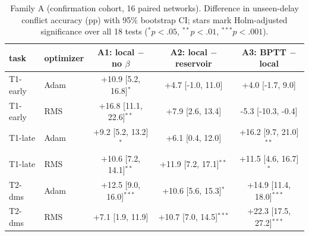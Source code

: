 \begin{table}[t]\centering\small
\caption{Family A (confirmation cohort, 16 paired networks). Difference in unseen-delay conflict accuracy (pp) with 95\% bootstrap CI; stars mark Holm-adjusted significance over all 18 tests ($^*p<.05$, $^{**}p<.01$, $^{***}p<.001$).}\label{tab:familyA}
\begin{tabular}{llccc}\toprule
task & optimizer & A1: local $-$ no $\beta$ & A2: local $-$ reservoir & A3: BPTT $-$ local\\ \midrule
T1-early & Adam & +10.9 [5.2, 16.8]$^{*}$ & +4.7 [-1.0, 11.0] & +4.0 [-1.7, 9.0]\\
T1-early & RMS & +16.8 [11.1, 22.6]$^{**}$ & +7.9 [2.6, 13.4] & -5.3 [-10.3, -0.4]\\
T1-late & Adam & +9.2 [5.2, 13.2]$^{*}$ & +6.1 [0.4, 12.0] & +16.2 [9.7, 21.0]$^{**}$\\
T1-late & RMS & +10.6 [7.2, 14.1]$^{**}$ & +11.9 [7.2, 17.1]$^{**}$ & +11.5 [4.6, 16.7]$^{*}$\\
T2-dms & Adam & +12.5 [9.0, 16.0]$^{***}$ & +10.6 [5.6, 15.3]$^{*}$ & +14.9 [11.4, 18.0]$^{***}$\\
T2-dms & RMS & +7.1 [1.9, 11.9] & +10.7 [7.0, 14.5]$^{***}$ & +22.3 [17.5, 27.2]$^{***}$\\
\bottomrule\end{tabular}\end{table}
